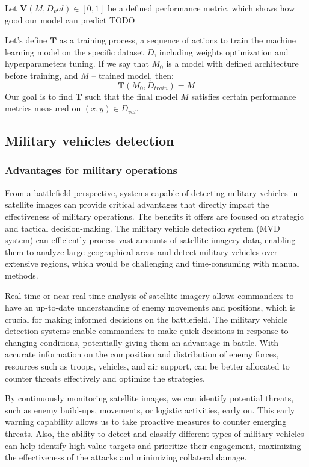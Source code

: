 \documentclass[14pt,a4paper]{extarticle}
\newcounter{e}
\numberwithin{equation}{section}
\numberwithin{figure}{section}
\begin{document}
Let $\mathbf{V}(M, D_val) \in [0, 1]$ be a defined performance metric, which shows how good our model can predict TODO  

Let's define $\mathbf{T}$ as a training process, a sequence of actions to train the machine learning model on the specific dataset $D$, including weights optimization and hyperparameters tuning. If we say that $M_{0}$ is a model with defined architecture before training, and $M$ -- trained model, then:
\begin{equation}
    \mathbf{T}(M_{0}, D_{train}) = M  
\end{equation}
Our goal is to find $\mathbf{T}$ such that the final model $M$ satisfies certain performance metrics measured on $(x, y) \in D_{val}$. 

        
\subsection{Military vehicles detection}
\subsubsection{Advantages for military operations}
From a battlefield perspective, systems capable of detecting military vehicles in satellite images can provide critical advantages that directly impact the effectiveness of military operations. The benefits it offers are focused on strategic and tactical decision-making. The military vehicle detection system (MVD system) can efficiently process vast amounts of satellite imagery data, enabling them to analyze large geographical areas and detect military vehicles over extensive regions, which would be challenging and time-consuming with manual methods.

Real-time or near-real-time analysis of satellite imagery allows commanders to have an up-to-date understanding of enemy movements and positions, which is crucial for making informed decisions on the battlefield. The military vehicle detection systems enable commanders to make quick decisions in response to changing conditions, potentially giving them an advantage in battle. With accurate information on the composition and distribution of enemy forces, resources such as troops, vehicles, and air support, can be better allocated to counter threats effectively and optimize the strategies.

By continuously monitoring satellite images, we can identify potential threats, such as enemy build-ups, movements, or logistic activities, early on. This early warning capability allows us to take proactive measures to counter emerging threats. Also, the ability to detect and classify different types of military vehicles can help  identify high-value targets and prioritize their engagement, maximizing the effectiveness of the attacks and minimizing collateral damage.
\end{document}
